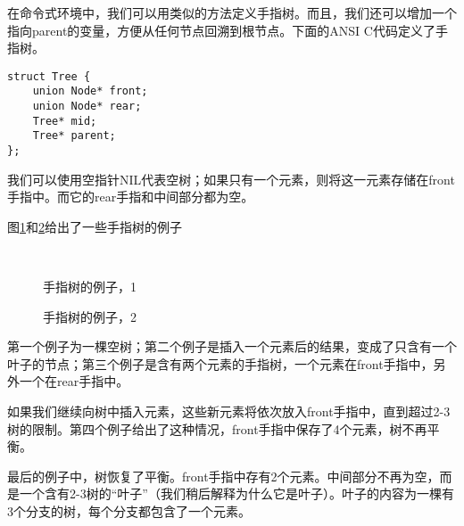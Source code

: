 \documentclass[UTF8]{article}
\begin{document}
在命令式环境中，我们可以用类似的方法定义手指树。而且，我们还可以增加一个指向parent的变量，方便从任何节点回溯到根节点。下面的ANSI C代码定义了手指树。

\lstset{language=C}
\begin{lstlisting}
struct Tree {
    union Node* front;
    union Node* rear;
    Tree* mid;
    Tree* parent;
};
\end{lstlisting}

我们可以使用空指针NIL代表空树；如果只有一个元素，则将这一元素存储在front手指中。而它的rear手指和中间部分都为空。

图\ref{fig:ftr-example-1}和\ref{fig:ftr-example-2}给出了一些手指树的例子

\begin{figure}[htbp]
  \centering
   \\
  \caption{手指树的例子，1} \label{fig:ftr-example-1}
\end{figure}

\begin{figure}[htbp]
  \centering
  \hspace{0.2\textwidth}
  \caption{手指树的例子，2} \label{fig:ftr-example-2}
\end{figure}

第一个例子为一棵空树；第二个例子是插入一个元素后的结果，变成了只含有一个叶子的节点；第三个例子是含有两个元素的手指树，一个元素在front手指中，另外一个在rear手指中。

如果我们继续向树中插入元素，这些新元素将依次放入front手指中，直到超过2-3树的限制。第四个例子给出了这种情况，front手指中保存了4个元素，树不再平衡。

最后的例子中，树恢复了平衡。front手指中存有2个元素。中间部分不再为空，而是一个含有2-3树的“叶子”（我们稍后解释为什么它是叶子）。叶子的内容为一棵有3个分支的树，每个分支都包含了一个元素。
\end{document}
